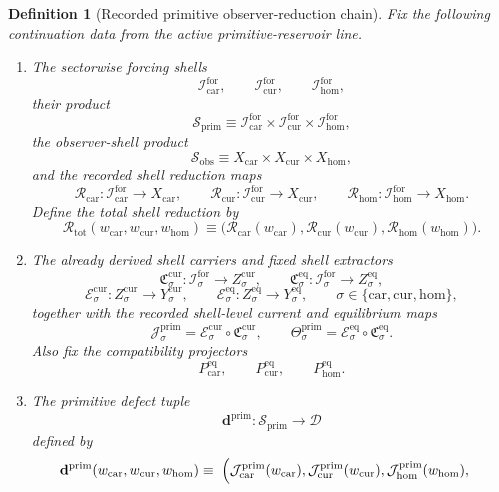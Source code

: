 \documentclass[11pt]{article}
\newcommand{\Car}{\mathrm{car}}
\newcommand{\Cur}{\mathrm{cur}}
\newcommand{\Hom}{\mathrm{hom}}
\newcommand{\ForSpace}[1]{\mathcal I_{#1}^{\mathrm{for}}}
\newcommand{\PrimShell}{\mathcal S_{\mathrm{prim}}}
\newcommand{\ObsShell}{\mathcal S_{\mathrm{obs}}}
\newcommand{\Reduction}[1]{\mathcal R_{#1}}
\newcommand{\ReductionTriple}{\mathcal R_{\mathrm{tot}}}
\newcommand{\CurrentCarrier}[1]{\mathfrak C_{#1}^{\mathrm{cur}}}
\newcommand{\EqCarrier}[1]{\mathfrak C_{#1}^{\mathrm{eq}}}
\newcommand{\CurrentExtract}[1]{\mathscr E_{#1}^{\mathrm{cur}}}
\newcommand{\EqExtract}[1]{\mathscr E_{#1}^{\mathrm{eq}}}
\newcommand{\PrimCurrent}[1]{\mathcal J_{#1}^{\mathrm{prim}}}
\newcommand{\PrimTheta}[1]{\Theta_{#1}^{\mathrm{prim}}}
\newcommand{\EqProj}[1]{P_{#1}^{\mathrm{eq}}}
\newcommand{\DefectSpace}{\mathcal D}
\newcommand{\PrimDefectTuple}{\mathbf d^{\mathrm{prim}}}
\newtheorem{definition}{Definition}
\begin{document}
\begin{definition}[Recorded primitive observer-reduction chain]
\label{def:fixed}
Fix the following continuation data from the active primitive-reservoir line.
\begin{enumerate}
    \item The sectorwise forcing shells
    \[
    \ForSpace{\Car},\qquad
    \ForSpace{\Cur},\qquad
    \ForSpace{\Hom},
    \]
    their product
    \[
    \PrimShell
    \equiv
    \ForSpace{\Car}\times\ForSpace{\Cur}\times\ForSpace{\Hom},
    \]
    the observer-shell product
    \[
    \ObsShell
    \equiv
    X_{\Car}\times X_{\Cur}\times X_{\Hom},
    \]
    and the recorded shell reduction maps
    \[
    \Reduction{\Car}:\ForSpace{\Car}\to X_{\Car},\qquad
    \Reduction{\Cur}:\ForSpace{\Cur}\to X_{\Cur},\qquad
    \Reduction{\Hom}:\ForSpace{\Hom}\to X_{\Hom}.
    \]
    Define the total shell reduction by
    \[
    \ReductionTriple(w_{\Car},w_{\Cur},w_{\Hom})
    \equiv
    \bigl(
    \Reduction{\Car}(w_{\Car}),
    \Reduction{\Cur}(w_{\Cur}),
    \Reduction{\Hom}(w_{\Hom})
    \bigr).
    \]
    \item The already derived shell carriers and fixed shell extractors
    \[
    \CurrentCarrier{\sigma}:\ForSpace{\sigma}\to Z_{\sigma}^{\mathrm{cur}},
    \qquad
    \EqCarrier{\sigma}:\ForSpace{\sigma}\to Z_{\sigma}^{\mathrm{eq}},
    \]
    \[
    \CurrentExtract{\sigma}:Z_{\sigma}^{\mathrm{cur}}\to Y_{\sigma}^{\mathrm{cur}},
    \qquad
    \EqExtract{\sigma}:Z_{\sigma}^{\mathrm{eq}}\to Y_{\sigma}^{\mathrm{eq}},
    \qquad
    \sigma\in\{\Car,\Cur,\Hom\},
    \]
    together with the recorded shell-level current and equilibrium maps
    \begin{equation}
    \PrimCurrent{\sigma}
    =
    \CurrentExtract{\sigma}\circ\CurrentCarrier{\sigma},
    \qquad
    \PrimTheta{\sigma}
    =
    \EqExtract{\sigma}\circ\EqCarrier{\sigma}.
    \label{eq:carriercomposites}
    \end{equation}
    Also fix the compatibility projectors
    \[
    \EqProj{\Car},\qquad
    \EqProj{\Cur},\qquad
    \EqProj{\Hom}.
    \]
    \item The primitive defect tuple
    \[
    \PrimDefectTuple:\PrimShell\to\DefectSpace
    \]
    defined by
    \begin{equation}
    \begin{aligned}
    \PrimDefectTuple(w_{\Car},w_{\Cur},w_{\Hom})
    \equiv\;
    \Bigl(
    &\PrimCurrent{\Car}(w_{\Car}),
    \PrimCurrent{\Cur}(w_{\Cur}),
    \PrimCurrent{\Hom}(w_{\Hom}),

\end{aligned}
\end{equation}
\end{enumerate}
\end{definition}
\end{document}
